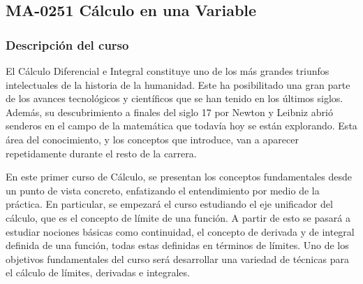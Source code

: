 \newpage

\subsection*{MA-0251 Cálculo en una Variable}
\hypertarget{MA0251}{}

\begin{refsection}
\begin{table}[H]
\end{table}



\subsubsection*{Descripción del curso}

El Cálculo Diferencial e Integral constituye uno de los más grandes triunfos intelectuales de la historia de la humanidad. Este ha posibilitado una gran parte de los avances tecnológicos y científicos que se han tenido en los últimos siglos. Además, su descubrimiento a finales del siglo 17 por Newton y Leibniz  abrió senderos en el campo de la matemática que todavía hoy se están explorando.
Esta área del conocimiento, y los conceptos que introduce, van a aparecer repetidamente durante el resto de la carrera.

En este primer curso de Cálculo, se presentan los conceptos fundamentales desde un punto de vista concreto, enfatizando el entendimiento por medio de la práctica. En particular, se empezará el curso estudiando el eje unificador del cálculo, que es el concepto de límite de una función. A partir de esto se pasará a estudiar nociones básicas como continuidad, el concepto de derivada y de integral definida de una función, todas estas definidas en términos de límites. Uno de los objetivos fundamentales del curso será desarrollar una variedad de técnicas para el cálculo de límites, derivadas e integrales.


\end{refsection}
